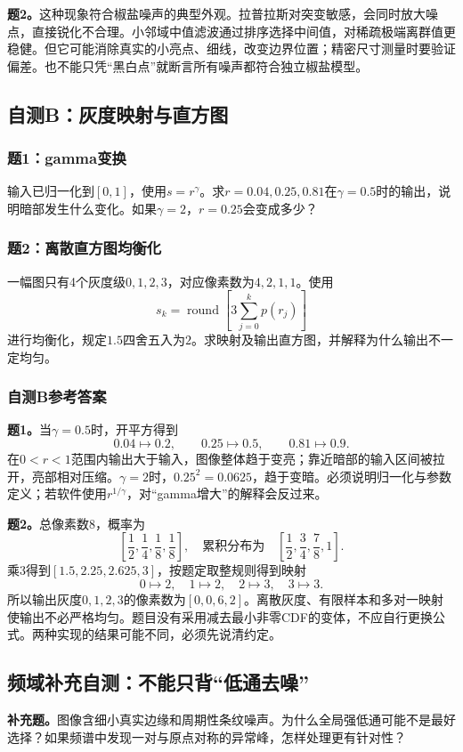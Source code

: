 \textbf{题2。}这种现象符合椒盐噪声的典型外观。拉普拉斯对突变敏感，会同时放大噪点，直接锐化不合理。小邻域中值滤波通过排序选择中间值，对稀疏极端离群值更稳健。但它可能消除真实的小亮点、细线，改变边界位置；精密尺寸测量时要验证偏差。也不能只凭“黑白点”就断言所有噪声都符合独立椒盐模型。
\clearpage
\subsection{自测B：灰度映射与直方图}
\subsubsection*{题1：gamma变换}
输入已归一化到$[0,1]$，使用$s=r^{\gamma}$。求$r=0.04,0.25,0.81$在$\gamma=0.5$时的输出，说明暗部发生什么变化。如果$\gamma=2$，$r=0.25$会变成多少？
\subsubsection*{题2：离散直方图均衡化}
一幅图只有4个灰度级$0,1,2,3$，对应像素数为$4,2,1,1$。使用
\[
s_k=\operatorname{round}\left[3\sum_{j=0}^{k}p(r_j)\right]
\]
进行均衡化，规定$1.5$四舍五入为$2$。求映射及输出直方图，并解释为什么输出不一定均匀。
\subsubsection*{自测B参考答案}
\textbf{题1。}当$\gamma=0.5$时，开平方得到
\[
0.04\mapsto0.2,\qquad0.25\mapsto0.5,\qquad0.81\mapsto0.9.
\]
在$0<r<1$范围内输出大于输入，图像整体趋于变亮；靠近暗部的输入区间被拉开，亮部相对压缩。$\gamma=2$时，$0.25^2=0.0625$，趋于变暗。必须说明归一化与参数定义；若软件使用$r^{1/\gamma}$，对“gamma增大”的解释会反过来。

\textbf{题2。}总像素数$8$，概率为
\[
\left[\frac12,\frac14,\frac18,\frac18\right],
\quad\text{累积分布为}\quad
\left[\frac12,\frac34,\frac78,1\right].
\]
乘3得到$[1.5,2.25,2.625,3]$，按题定取整规则得到映射
\[
0\mapsto2,\quad1\mapsto2,\quad2\mapsto3,\quad3\mapsto3.
\]
所以输出灰度$0,1,2,3$的像素数为$[0,0,6,2]$。离散灰度、有限样本和多对一映射使输出不必严格均匀。题目没有采用减去最小非零CDF的变体，不应自行更换公式。两种实现的结果可能不同，必须先说清约定。
\subsection{频域补充自测：不能只背“低通去噪”}
\textbf{补充题。}图像含细小真实边缘和周期性条纹噪声。为什么全局强低通可能不是最好选择？如果频谱中发现一对与原点对称的异常峰，怎样处理更有针对性？

